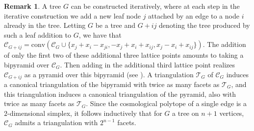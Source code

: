 \documentclass[11pt]{article}
\theoremstyle{definition}
\newtheorem{rema}[theo]{Remark}
\numberwithin{equation}{section}
\begin{document}
\begin{rema}
    A tree $G$ can be constructed iteratively, where at each step in the iterative construction we add a new leaf node $j$ attached by an edge to a node $i$ already in the tree. Letting $G$ be a tree and $G + ij$ denoting the tree produced by such a leaf addition to $G$, we have that $\mathcal{C}_{G + ij} = \textrm{conv}(\mathcal{C}_G \cup \{x_j + x_i - x_{ji},-x_j + x_i + x_{ij}, x_j - x_i + x_{ij}\})$. The addition of only the first two of these additional three lattice points amounts to taking a bipyramid over $\mathcal{C}_G$.  Then adding in the additional third lattice point realizes $\mathcal{C}_{G +ij}$ as a pyramid over this bipyramid (see \cite[Proposition 4.1]{kuhne2022faces}). 
    A triangulation $\mathcal{T}_G$ of $\mathcal{C}_G$ induces a canonical triangulation of the bipyramid with twice as many facets as $\mathcal{T}_G$, and this triangulation induces a canonical triangulation of the pyramid, also with twice as many facets as $\mathcal{T}_G$. 
    Since the cosmological polytope of a single edge is a $2$-dimensional simplex, it follows inductively that for $G$ a tree on $n+1$ vertices, $\mathcal{C}_G$ admits a triangulation with $2^{n-1}$ facets. 
\end{rema}

\end{document}
